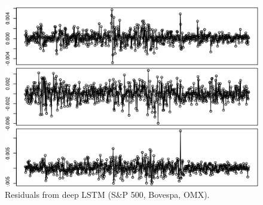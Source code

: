 \documentclass[12pt, letterpaper]{amsart}%
\begin{document}
\begin{figure}[H]
\caption{Residuals from deep LSTM (S\&P 500, Bovespa, OMX).}
\centering
\includegraphics[scale=0.8]{lstm_deep_resid.png}
\end{figure}

\end{document}
